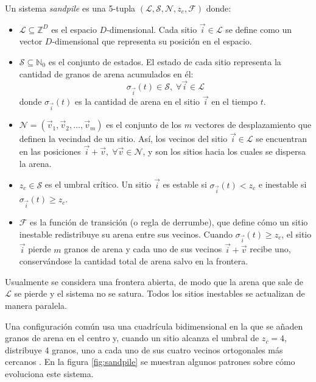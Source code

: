\begin{definition}
	Un sistema \textit{sandpile} es una 5-tupla $(\mathcal{L}, \mathcal{S}, \mathcal{N}, z_c, \mathcal{F})$ donde:
	\begin{itemize}
		\item $\mathcal{L} \subseteq \mathbb{Z}^D$ es el espacio $D$-dimensional. Cada sitio $\vec{i} \in \mathcal{L}$ se define como un vector $D$-dimensional que representa su posición en el espacio.
		\item $\mathcal{S} \subseteq \mathbb{N}_0$ es el conjunto de estados. El estado de cada sitio representa la cantidad de granos de arena acumulados en él:
		\[
		\sigma_{\vec{i}}(t) \in \mathcal{S},\; \forall \vec{i} \in \mathcal{L}
		\]
		donde $\sigma_{\vec{i}}(t)$ es la cantidad de arena en el sitio $\vec{i}$ en el tiempo $t$.
		\item $\mathcal{N} = (\vec{v}_1, \vec{v}_2, \dots, \vec{v}_m)$ es el conjunto de los $m$ vectores de desplazamiento que definen la vecindad de un sitio. Así, los vecinos del sitio $\vec{i} \in \mathcal{L}$ se encuentran en las posiciones $\vec{i} + \vec{v},\; \forall \vec{v} \in \mathcal{N}$, y son los sitios hacia los cuales se dispersa la arena.
		\item $z_c \in \mathcal{S}$ es el umbral crítico. Un sitio $\vec{i}$ es estable si $\sigma_{\vec{i}}(t) < z_c$ e inestable si $\sigma_{\vec{i}}(t) \geq z_c$.
		\item $\mathcal{F}$ es la función de transición (o regla de derrumbe), que define cómo un sitio inestable redistribuye su arena entre sus vecinos. Cuando $\sigma_{\vec{i}}(t) \geq z_c$, el sitio $\vec{i}$ pierde $m$ granos de arena y cada uno de sus vecinos $\vec{i} + \vec{v}$ recibe uno, conservándose la cantidad total de arena salvo en la frontera.
	\end{itemize}
	Usualmente se considera una frontera abierta, de modo que la arena que sale de $\mathcal{L}$ se pierde y el sistema no se satura. Todos los sitios inestables se actualizan de manera paralela.

\end{definition}

Una configuración común usa una cuadrícula bidimensional en la que se añaden granos de arena en el centro y, cuando un sitio alcanza el umbral de $z_c = 4$, distribuye 4 granos, uno a cada uno de sus cuatro vecinos ortogonales más cercanos \cite{dhar1999abelian}. En la figura \ref{fig:sandpile} se muestran algunos patrones sobre cómo evoluciona este sistema.

